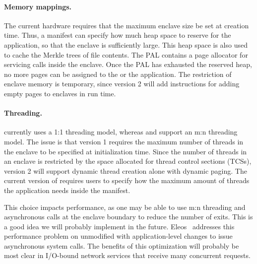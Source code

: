 \paragraph{Memory mappings.}
The current \sgx{} hardware requires that the maximum enclave size 
be set at creation time.
Thus, 
a \graphenesgx{} manifest can specify how much heap space to reserve for the application,
so that the enclave is sufficiently large.
This heap space is also used to cache the Merkle trees of file contents.
The \sgx{} PAL contains a page allocator
for servicing  calls inside the enclave.
Once the \sgx{} PAL has exhausted the reserved heap,
no more pages can be assigned to the \libos{} or the application.
The restriction of enclave memory
is temporary, since \sgx{} version 2 will add instructions for adding empty pages to enclaves in run time.

\paragraph{Threading.}
\graphenesgx{} currently uses a 1:1 threading model,
whereas \scone{} and \panoply{} support an m:n threading model.
The issue is that \sgx{} version 1 requires the maximum number of threads in the enclave
to be specified at initialization time.
Since the number of threads in an enclave is restricted
by the space allocated for thread control sections (TCSs),
\sgx{} version 2 will support dynamic thread creation
alone with dynamic paging.
The current version of \graphenesgx{} requires users to specify how the maximum amount of threads the application needs inside the manifest.

This choice impacts performance, as one may be able to use m:n threading and asynchronous calls at the enclave boundary
to reduce the number of exits.
This is a good idea we will probably implement in the future.
Eleos~\cite{orenbach17eleos} addresses this performance problem on unmodified \graphenesgx{} with 
application-level changes to issue asynchronous system calls.
The benefits of this %
optimization will probably be most clear in I/O-bound network services that receive many concurrent requests.



